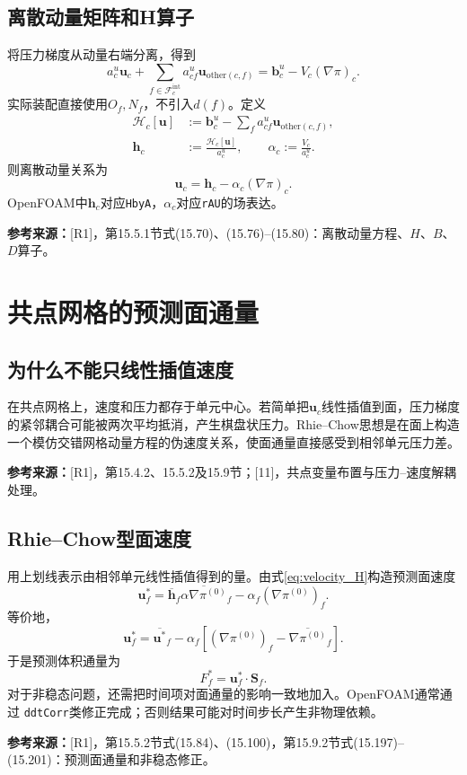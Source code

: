 \documentclass[UTF8,12pt,a4paper]{ctexart}
\numberwithin{equation}{section}
\newcommand{\Jasak}{\textnormal{[11]}}
\newcommand{\Rone}{\textnormal{[R1]}}
\newcommand{\source}[1]{\par\smallskip\noindent\colorbox{sourcebg}{%
  \parbox{0.955\linewidth}{\footnotesize\color{sourcegray}\textbf{参考来源：}#1}}\par\smallskip}
\begin{document}
\subsection{离散动量矩阵和H算子}
将压力梯度从动量右端分离，得到
\begin{equation}
  \boxed{a_c^u\bm u_c+
  \sum_{f\in\mathcal F_c^{\mathrm{int}}}a_{cf}^u
  \bm u_{\mathrm{other}(c,f)}
  =\bm b_c^u-V_c(\nabla\pi)_c.}
  \label{eq:momentum_algebra}
\end{equation}
实际装配直接使用$O_f,N_f$，不引入$d(f)$。定义
\begin{align}
  \mathcal H_c[\bm u]
  &:=\bm b_c^u-\sum_fa_{cf}^u\bm u_{\mathrm{other}(c,f)},\\
  \bm h_c&:=\frac{\mathcal H_c[\bm u]}{a_c^u},\qquad
  \alpha_c:=\frac{V_c}{a_c^u}.
  \label{eq:H_alpha}
\end{align}
则离散动量关系为
\begin{equation}
  \boxed{\bm u_c=\bm h_c-\alpha_c(\nabla\pi)_c.}
  \label{eq:velocity_H}
\end{equation}
OpenFOAM中$\bm h_c$对应\texttt{HbyA}，$\alpha_c$对应\texttt{rAU}的场表达。
\source{\Rone，第15.5.1节式(15.70)、(15.76)--(15.80)：离散动量方程、$H$、$B$、$D$算子。}

\section{共点网格的预测面通量}
\subsection{为什么不能只线性插值速度}
在共点网格上，速度和压力都存于单元中心。若简单把$\bm u_c$线性插值到面，压力梯度的紧邻耦合可能被两次平均抵消，产生棋盘状压力。Rhie--Chow思想是在面上构造一个模仿交错网格动量方程的伪速度关系，使面通量直接感受到相邻单元压力差。
\source{\Rone，第15.4.2、15.5.2及15.9节；\Jasak，共点变量布置与压力--速度解耦处理。}

\subsection{Rhie--Chow型面速度}
用上划线表示由相邻单元线性插值得到的量。由式\eqref{eq:velocity_H}构造预测面速度
\begin{equation}
  \boxed{\bm u_f^*
  =\overline{\bm h}_f
  \overline{\alpha\nabla\pi^{(0)}}_f
  -\alpha_f(\nabla\pi^{(0)})_f.}
  \label{eq:rhie_chow}
\end{equation}
等价地，
\[
  \bm u_f^*=\overline{\bm u^*}_f
  -\alpha_f\left[(\nabla\pi^{(0)})_f
  -\overline{\nabla\pi^{(0)}}_f\right].
\]
于是预测体积通量为
\begin{equation}
  \boxed{F_f^*=\bm u_f^*\cdot\bm S_f.}
  \label{eq:predicted_flux}
\end{equation}
对于非稳态问题，还需把时间项对面通量的影响一致地加入。OpenFOAM通常通过
\texttt{ddtCorr}类修正完成；否则结果可能对时间步长产生非物理依赖。
\source{\Rone，第15.5.2节式(15.84)、(15.100)，第15.9.2节式(15.197)--(15.201)：预测面通量和非稳态修正。}
\end{document}
